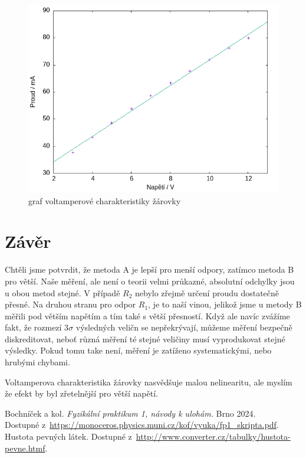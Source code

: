 \documentclass[a4paper,11pt]{article}
\begin{document}
\begin{figure}[htpb]
  \centering
  \includegraphics[width=0.7\linewidth]{zarovka-graf.png}
  \caption{graf voltamperové charakteristiky žárovky}
\end{figure}


\section{Závěr} 

Chtěli jsme potvrdit, že metoda A je lepší pro menší odpory, zatímco metoda B pro větší. 
Naše měření, ale není o teorii velmi průkazné, absolutní odchylky jsou u obou metod stejné. 
V případě $R_2$ nebylo zřejmě určení proudu dostatečně přesné. 
Na druhou stranu pro odpor $R_1$, je to naší vinou, jelikož jsme u metody B měřili pod větším napětím a tím také s větší přesností. 
Když ale navíc zvážíme fakt, že rozmezí 3$\sigma$ výsledných veličn se nepřekrývají, 
můžeme měření bezpečně diskreditovat, neboť různá měření té stejné veličiny musí vyprodukovat stejné výsledky. 
Pokud tomu take není, měření je zatíženo systematickými, nebo hrubými chybami. \par
Voltamperova charakteristika žárovky nasvědšuje malou nelinearitu, ale myslím že efekt by 
byl zřetelnější pro větší napětí.



\begin{thebibliography}{0}
 Bochníček a kol. \textit{Fyzikální praktikum 1, návody k ulohám.} Brno 2024.\\ Dostupné z~\url{https://monoceros.physics.muni.cz/kof/vyuka/fp1_skripta.pdf}.   
 Hustota pevných látek. Dostupné z~\url{http://www.converter.cz/tabulky/hustota-pevne.htmf}.   
\end{thebibliography}
\end{document}
